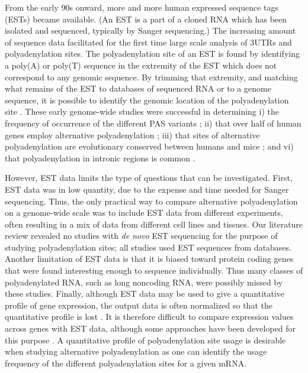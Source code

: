 From the early 90s onward, more and more human expressed sequence tags (ESTs)
became available. (An EST is a part of a cloned RNA which has been isolated and
sequenced, typically by Sanger sequencing.) The increasing amount of sequence
data facilitated for the first time large scale analysis of 3\ppp UTRs and
polyadenylation sites. The polyadenylation site of an EST is found by
identifying a poly(A) or poly(T) sequence in the extremity of the EST which
does not correspond to any genomic sequence. By trimming that extremity, and
matching what remains of the EST to databases of sequenced RNA or to a genome
sequence, it is possible to identify the genomic location of the
polyadenylation site \cite{beaudoing_patterns_2000, tian_large-scale_2005}.
These early genome-wide studies were successful in determining i) the frequency
of occurrence of the different PAS variants \cite{beaudoing_patterns_2000}; ii)
that over half of human genes employ alternative polyadenylation
\cite{tian_large-scale_2005}; iii) that sites of alternative polyadenylation
are evolutionary conserved between humans and mice
\cite{tian_large-scale_2005}; and vi) that polyadenylation in intronic regions
is common \cite{tian_widespread_2007}.

However, EST data limits the type of questions that can be investigated. First,
EST data was in low quantity, due to the expense and time needed for Sanger
sequencing. Thus, the only practical way to compare alternative polyadenylation
on a genome-wide scale was to include EST data from different experiments,
often resulting in a mix of data from different cell lines and tissues. Our
literature review revealed no studies with \textit{de novo} EST sequencing for
the purpose of studying polyadenylation sites; all studies used EST sequences
from databases. Another limitation of EST data is that it is biased toward
protein coding genes that were found interesting enough to sequence
individually. Thus many classes of polyadenylated RNA, such as long noncoding
RNA, were possibly missed by these studies. Finally, although EST data may be
used to give a quantitative profile of gene expression, the output data is
often normalized so that the quantitative profile is lost
\cite{liu_quantitative_2006}. It is therefore difficult to compare expression
values across genes with EST data, although some approaches have been developed
for this purpose \cite{liu_quantitative_2006}. A quantitative profile of
polyadenylation site usage is desirable when studying alternative
polyadenylation as one can identify the usage frequency of the different
polyadenylation sites for a given mRNA.

